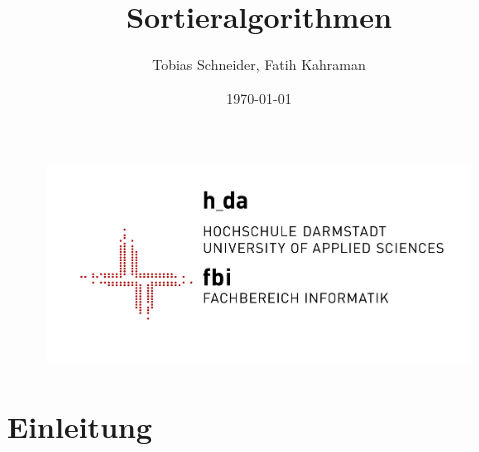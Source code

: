 \documentclass{article}
\title{Sortieralgorithmen}
\author{Tobias Schneider, Fatih Kahraman}
\date{\today}
\begin{document}
\begin{figure}
\includegraphics[scale = 1.5]{fbi_bild.png}
\end{figure}

\maketitle %
\thispagestyle{empty} %
\newpage{}

\tableofcontents{}%
\setcounter{page}{1} %
\newpage{}


\section{Einleitung}
\end{document}
